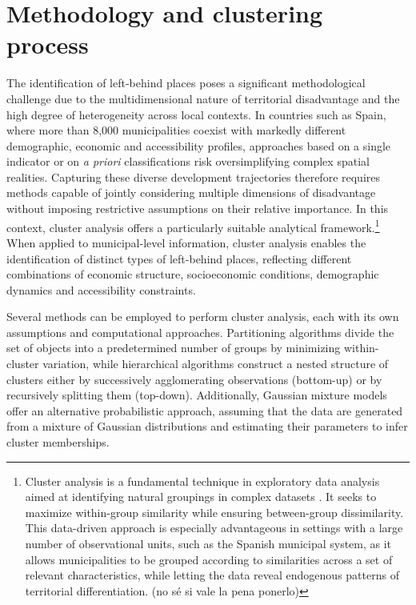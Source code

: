\documentclass[a4paper,11pt,oneside]{article}
\begin{document}
\section{Methodology and clustering process}
\label{sec:methodology}



The identification of left-behind places poses a significant methodological challenge due to the multidimensional nature of territorial disadvantage and the high degree of heterogeneity across local contexts. In countries such as Spain, where more than 8,000 municipalities coexist with markedly different demographic, economic and accessibility profiles, approaches based on a single indicator or on \textsl{a priori} classifications risk oversimplifying complex spatial realities. Capturing these diverse development trajectories therefore requires methods capable of jointly considering multiple dimensions of disadvantage without imposing restrictive assumptions on their relative importance. In this context, cluster analysis offers a particularly suitable analytical framework.\footnote{Cluster analysis is a fundamental technique in exploratory data analysis aimed at identifying natural groupings in complex datasets \citep{johnson2002applied}. It seeks to maximize within-group similarity while ensuring between-group dissimilarity. This data-driven approach is especially advantageous in settings with a large number of observational units, such as the Spanish municipal system, as it allows municipalities to be grouped according to similarities across a set of relevant characteristics, while letting the data reveal endogenous patterns of territorial differentiation. \color{red} (no sé si vale la pena ponerlo)}  When applied to municipal-level information, cluster analysis enables the identification of distinct types of left-behind places, reflecting different combinations of economic structure, socioeconomic conditions, demographic dynamics and accessibility constraints.

\color{black}






Several methods can be employed to perform cluster analysis, each with its own assumptions and computational approaches. Partitioning algorithms divide the set of objects into a predetermined number of groups by minimizing within-cluster variation, while hierarchical algorithms construct a nested structure of clusters either by successively agglomerating observations (bottom-up) or by recursively splitting them (top-down). Additionally, Gaussian mixture models offer an alternative probabilistic approach, assuming that the data are generated from a mixture of Gaussian distributions and estimating their parameters to infer cluster memberships.
\end{document}
